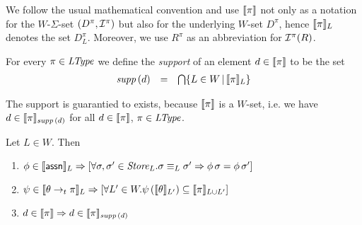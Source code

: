 \documentclass[12pt,a4paper]{report}
\begin{document}
We follow the usual mathematical convention and use $\llbracket\pi\rrbracket$ not only as a notation
for the $W$-$\Sigma$-set $(D^\pi,\mathcal{I}^\pi)$ but also for the underlying $W$-set $D^\pi$,
hence $\llbracket\pi\rrbracket_L$ denotes the set $D^\pi_L$. Moreover, we use $R^\pi$ as an abbreviation
for $\mathcal{I}^\pi(R)$.

\begin{definition}[Support]
  For every $\pi\in\mathit{LType}$ we define the {\em support} of an element $d \in \llbracket\pi\rrbracket$ to be the set
  \[\begin{array}{rcl}
    \mathit{supp}\,(d) &=& \bigcap \{L\in W\,|\,\llbracket\pi\rrbracket_L\}
  \end{array}\]
\end{definition}

The support is guarantied to exists, because $\llbracket\pi\rrbracket$ is a $W$-set, i.e. we
have $d \in \llbracket\pi\rrbracket_{\mathit{supp}\,(d)}$ for all $d\in\llbracket\pi\rrbracket$, $\pi\in\mathit{LType}$.

\begin{lemma}
  Let $L\in W$. Then
  \begin{enumerate}
    \item $\phi\in\llbracket\mathsf{assn}\rrbracket_L \Rightarrow \left[ \forall \sigma,\sigma'\in\mathit{Store}_L.
              \sigma \equiv_L \sigma' \Rightarrow \phi\,\sigma = \phi\,\sigma'\right]$
    \item $\psi\in\llbracket\theta\rightarrow_t\pi\rrbracket_L \Rightarrow
              \left[\forall L'\in W. \psi\,(\llbracket\theta\rrbracket_{L'})\subseteq\llbracket\pi\rrbracket_{L \cup L'} \right]$
    \item $d \in \llbracket\pi\rrbracket \Rightarrow d \in \llbracket\pi\rrbracket_{\mathit{supp}\,(d)}$
  \end{enumerate}
\end{lemma}
\end{document}
